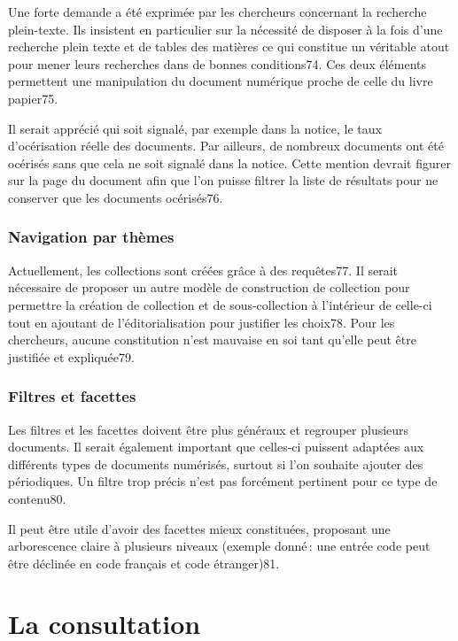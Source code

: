 Une forte demande a été exprimée par les chercheurs concernant la recherche plein-texte. Ils insistent en particulier sur la nécessité de disposer à la fois d’une recherche plein texte et de tables des matières ce qui constitue un véritable atout pour mener leurs recherches dans de bonnes conditions74. Ces deux éléments permettent une manipulation du document numérique proche de celle du livre papier75.  

Il serait apprécié qui soit signalé, par exemple dans la notice, le taux d’océrisation réelle des documents. Par ailleurs, de nombreux documents ont été océrisés sans que cela ne soit signalé dans la notice. Cette mention devrait figurer sur la page du document afin que l’on puisse filtrer la liste de résultats pour ne conserver que les documents océrisés76. 

\subsubsection{Navigation par thèmes}  

Actuellement, les collections sont créées grâce à des requêtes77. Il serait nécessaire de proposer un autre modèle de construction de collection pour permettre la création de collection et de sous-collection à l’intérieur de celle-ci tout en ajoutant de l’éditorialisation pour justifier les choix78. Pour les chercheurs, aucune constitution n’est mauvaise en soi tant qu’elle peut être justifiée et expliquée79. 

\subsubsection{Filtres et facettes} 

Les filtres et les facettes doivent être plus généraux et regrouper plusieurs documents. Il serait également important que celles-ci puissent adaptées aux différents types de documents numérisés, surtout si l’on souhaite ajouter des périodiques. Un filtre trop précis n’est pas forcément pertinent pour ce type de contenu80.  

Il peut être utile d’avoir des facettes mieux constituées, proposant une arborescence claire à plusieurs niveaux (exemple donné : une entrée code peut être déclinée en code français et code étranger)81.  



\section{La consultation} 

